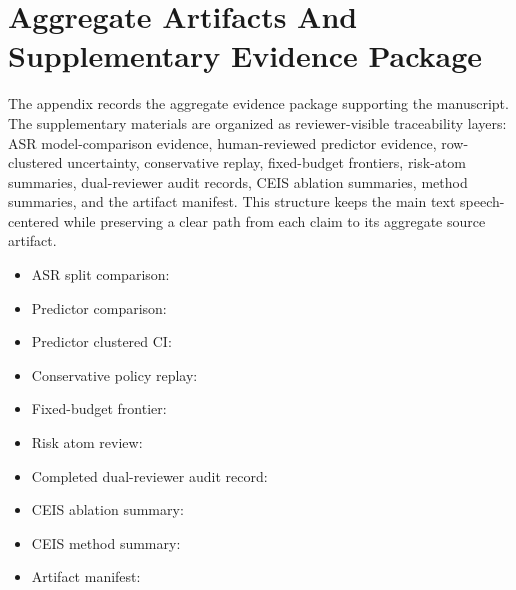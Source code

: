 \appendix
\section{Aggregate Artifacts And Supplementary Evidence Package}
\label{app:aggregate_artifacts}

The appendix records the aggregate evidence package supporting the manuscript. The supplementary materials are organized as reviewer-visible traceability layers: ASR model-comparison evidence, human-reviewed predictor evidence, row-clustered uncertainty, conservative replay, fixed-budget frontiers, risk-atom summaries, dual-reviewer audit records, CEIS ablation summaries, method summaries, and the artifact manifest. This structure keeps the main text speech-centered while preserving a clear path from each claim to its aggregate source artifact.

\begin{itemize}
\item ASR split comparison: 
\item Predictor comparison: 
\item Predictor clustered CI: 
\item Conservative policy replay: 
\item Fixed-budget frontier: 
\item Risk atom review: 
\item Completed dual-reviewer audit record: 
\item CEIS ablation summary: 
\item CEIS method summary: 
\item Artifact manifest: 
\end{itemize}

